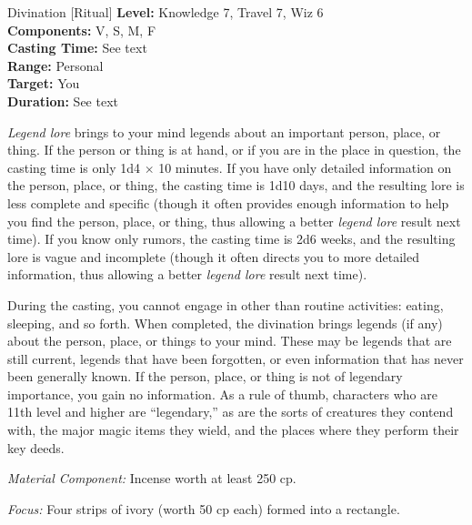 {Divination [Ritual]}
{
	\textbf{Level:}
	Knowledge 7, Travel 7, Wiz 6\\
	\textbf{Components:}
	V, S, M, F\\
	\textbf{Casting Time:}
	See text\\
	\textbf{Range:}
	Personal\\
	\textbf{Target:}
	You\\
	\textbf{Duration:}
	See text\\
}
{
	\emph{Legend lore} brings to your mind legends about an important person, place, or thing. If the person or thing is at hand, or if you are in the place in question, the casting time is only 1d4 $\times$ 10 minutes. If you have only detailed information on the person, place, or thing, the casting time is 1d10 days, and the resulting lore is less complete and specific (though it often provides enough information to help you find the person, place, or thing, thus allowing a better \emph{legend lore} result next time). If you know only rumors, the casting time is 2d6 weeks, and the resulting lore is vague and incomplete (though it often directs you to more detailed information, thus allowing a better \emph{legend lore} result next time).

	During the casting, you cannot engage in other than routine activities: eating, sleeping, and so forth. When completed, the divination brings legends (if any) about the person, place, or things to your mind. These may be legends that are still current, legends that have been forgotten, or even information that has never been generally known. If the person, place, or thing is not of legendary importance, you gain no information. As a rule of thumb, characters who are 11th level and higher are ``legendary,'' as are the sorts of creatures they contend with, the major magic items they wield, and the places where they perform their key deeds.

	\textit{Material Component:}
	Incense worth at least 250 cp.

	\textit{Focus:}
	Four strips of ivory (worth 50 cp each) formed into a rectangle.

}
